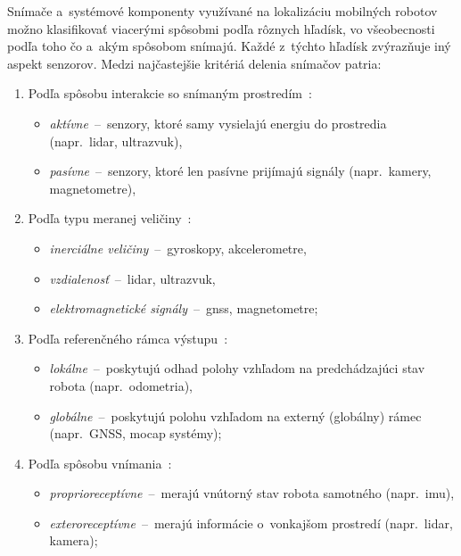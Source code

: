   Snímače a~systémové komponenty využívané na lokalizáciu mobilných robotov možno klasifikovať viacerými spôsobmi podľa rôznych hľadísk, vo všeobecnosti podľa toho čo a~akým spôsobom snímajú. Každé z~týchto hľadísk zvýrazňuje iný aspekt senzorov. Medzi najčastejšie kritériá delenia snímačov patria:

\begin{enumerate}
  \item Podľa spôsobu interakcie so snímaným prostredím~\cite{christensenSensingEstimation2016}:
  \begin{itemize}
    \item \emph{aktívne}~--~senzory, ktoré samy vysielajú energiu do prostredia (napr.\ \acrshort{lidar}, ultrazvuk),
    \item \emph{pasívne}~--~senzory, ktoré len pasívne prijímajú signály (napr.\ kamery, magnetometre),
  \end{itemize}

  \item Podľa typu meranej veličiny~\autocite{siegwartIntroductionAutonomousMobile2011,thrunProbabilisticRobotics2005}:
  \begin{itemize}
    \item \emph{inerciálne veličiny}~--~gyroskopy, akcelerometre,
    \item \emph{vzdialenosť}~--~\acrshort{lidar}, ultrazvuk,
    \item \emph{elektromagnetické signály}~--~\acrshort{gnss}, magnetometre;
  \end{itemize}
  
  \item Podľa referenčného rámca výstupu~\cite{inproceedings}:
  \begin{itemize}
    \item \emph{lokálne}~--~poskytujú odhad polohy vzhľadom na predchádzajúci stav robota (napr.\ odometria),
    \item \emph{globálne}~--~poskytujú polohu vzhľadom na externý (globálny) rámec (napr.\ GNSS, \acrshort{mocap} systémy);
  \end{itemize}
  
  \item Podľa spôsobu vnímania~\cite{siegwartIntroductionAutonomousMobile2011}:
  \begin{itemize}
    \item \emph{proprioreceptívne}~--~merajú vnútorný stav robota samotného (napr.\ \acrshort{imu}),
    \item \emph{exteroreceptívne}~--~merajú informácie o~vonkajšom prostredí (napr.\ \acrshort{lidar}, kamera);
  \end{itemize}
  

\end{enumerate}
